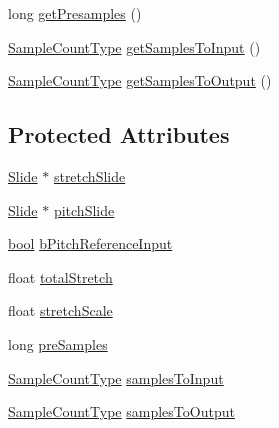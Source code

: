 \begin{DoxyCompactItemize}
\item 
long \hyperlink{class__sbsms___1_1_s_b_s_m_s_interface_sliding_imp_acd813c980f25704c373d91d0cefb32a1}{get\+Presamples} ()
\item 
\hyperlink{namespace__sbsms___ae4ba47977e7e07f5945e529e2256b662}{Sample\+Count\+Type} \hyperlink{class__sbsms___1_1_s_b_s_m_s_interface_sliding_imp_ad612cb61bdd8c5374bdf9c33471745fa}{get\+Samples\+To\+Input} ()
\item 
\hyperlink{namespace__sbsms___ae4ba47977e7e07f5945e529e2256b662}{Sample\+Count\+Type} \hyperlink{class__sbsms___1_1_s_b_s_m_s_interface_sliding_imp_a932709c9416b8caebce9500150b48840}{get\+Samples\+To\+Output} ()
\end{DoxyCompactItemize}
\subsection*{Protected Attributes}
\begin{DoxyCompactItemize}
\item 
\hyperlink{class__sbsms___1_1_slide}{Slide} $\ast$ \hyperlink{class__sbsms___1_1_s_b_s_m_s_interface_sliding_imp_a56b988206b213ca52f53db3e203785eb}{stretch\+Slide}
\item 
\hyperlink{class__sbsms___1_1_slide}{Slide} $\ast$ \hyperlink{class__sbsms___1_1_s_b_s_m_s_interface_sliding_imp_a050fad0731035f64dd21d88344e9c1cb}{pitch\+Slide}
\item 
\hyperlink{mac_2config_2i386_2lib-src_2libsoxr_2soxr-config_8h_abb452686968e48b67397da5f97445f5b}{bool} \hyperlink{class__sbsms___1_1_s_b_s_m_s_interface_sliding_imp_a7c916bf73455a6a8a62cb7a4a85991bc}{b\+Pitch\+Reference\+Input}
\item 
float \hyperlink{class__sbsms___1_1_s_b_s_m_s_interface_sliding_imp_a63e50de699224b59147938a5cc17b24a}{total\+Stretch}
\item 
float \hyperlink{class__sbsms___1_1_s_b_s_m_s_interface_sliding_imp_afc2b45ff75503c9cc226fd1117c831c1}{stretch\+Scale}
\item 
long \hyperlink{class__sbsms___1_1_s_b_s_m_s_interface_sliding_imp_a228d094878d1d16d4fe884bf42e7385c}{pre\+Samples}
\item 
\hyperlink{namespace__sbsms___ae4ba47977e7e07f5945e529e2256b662}{Sample\+Count\+Type} \hyperlink{class__sbsms___1_1_s_b_s_m_s_interface_sliding_imp_a9569618090c12bac71eed9bcfd83c0ed}{samples\+To\+Input}
\item 
\hyperlink{namespace__sbsms___ae4ba47977e7e07f5945e529e2256b662}{Sample\+Count\+Type} \hyperlink{class__sbsms___1_1_s_b_s_m_s_interface_sliding_imp_aeb7410385567eb1c1ede2cf5d8b62565}{samples\+To\+Output}
\end{DoxyCompactItemize}
